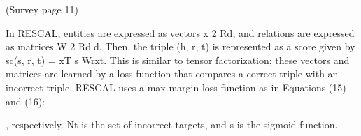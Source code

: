 (Survey page 11)

In RESCAL, entities are
expressed as vectors x 2 Rd, and relations are expressed as matrices W 2 Rdd. Then,
the triple (h, r, t) is represented as a score given by sc(s, r, t) = xT
s Wrxt. This is similar to
tensor factorization; these vectors and matrices are learned by a loss function that compares
a correct triple with an incorrect triple. RESCAL uses a max-margin loss function as in
Equations (15) and (16):

% 
% 
% 
% 
% 
% 
% 
% 

, respectively. Nt is the set of incorrect targets, and s is the sigmoid function.





